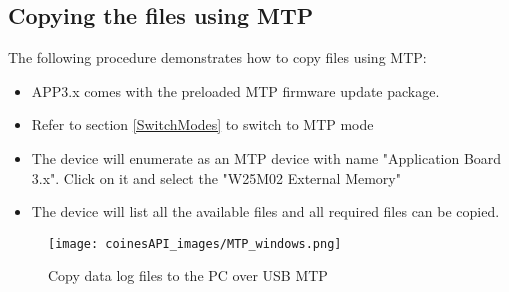 \documentclass{article}
\begin{document}
\subsection{Copying the files using MTP}
The following procedure demonstrates how to copy files using MTP:
\begin{itemize}
	\item APP3.x comes with the preloaded MTP firmware update package.
	\item Refer to section \ref{SwitchModes} to switch to MTP mode
	\item The device will enumerate as an MTP device with name "Application Board 3.x". Click on it and select the "W25M02 External Memory"
	\item The device will list all the available files and all required files can be copied.
\end{itemize}

\begin{figure}[H]
	\begin{center}
		\texttt{[image: coinesAPI\_images/MTP\_windows.png]}
		\caption{Copy data log files to the PC over USB MTP}
	\end{center}
\end{figure}

\newpage
\end{document}
